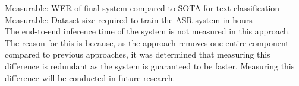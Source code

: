 Measurable: WER of final system compared to SOTA for text classification \\
Measurable: Dataset size required to train the ASR system in hours \\

The end-to-end inference time of the system is not measured in this
approach. The reason for this is because, as the approach removes one
entire component compared to previous approaches, it was determined that
measuring this difference is redundant as the system is guaranteed
to be faster. Measuring this difference will be conducted in future
research.